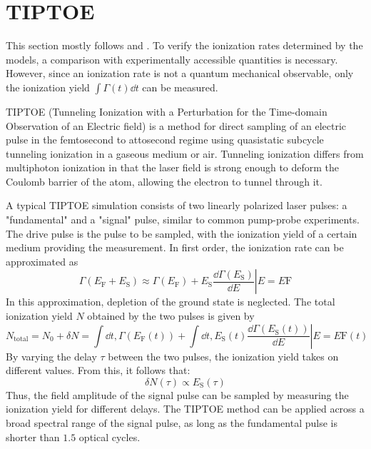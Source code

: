 \section{TIPTOE}
This section mostly follows \cite{Park:18} and \cite{manorammasterthesis}.
To verify the ionization rates determined by the models, a comparison with experimentally accessible quantities is necessary.
However, since an ionization rate is not a quantum mechanical observable, only the ionization yield $\int \Gamma(t) \dd t$ can be measured.

TIPTOE \cite{Park:18} (Tunneling Ionization with a Perturbation for the Time-domain Observation of an Electric field) is a method for direct sampling of an electric pulse in the femtosecond to attosecond regime using quasistatic subcycle tunneling ionization in a gaseous medium or air.
Tunneling ionization differs from multiphoton ionization in that the laser field is strong enough to deform the Coulomb barrier of the atom, allowing the electron to tunnel through it.

A typical TIPTOE simulation consists of two linearly polarized laser pulses: a "fundamental" and a "signal" pulse, similar to common pump-probe experiments.
The drive pulse is the pulse to be sampled, with the ionization yield of a certain medium providing the measurement.
In first order, the ionization rate can be approximated as
\begin{equation}
\Gamma(E_{\mathrm{F}}+E_{\mathrm{S}})\approx\Gamma(E_{\mathrm{F}})+\left.E_{\mathrm{S}}\frac{\dd \Gamma(E_{\mathrm{S}})}{\dd E}\right|{E=E{\mathrm{F}}}
\end{equation}
In this approximation, depletion of the ground state is neglected.
The total ionization yield $N$ obtained by the two pulses is given by
\begin{equation*}
N_{\mathrm{total}}=N_0+\delta N = \int \dd t,\Gamma(E_{\mathrm{F}}(t))+\int \dd t,E_{\mathrm{S}}(t)\left.\frac{\dd \Gamma(E_{\mathrm{S}}(t))}{\dd E}\right|{E=E{\mathrm{F}}(t)}
\end{equation*}
By varying the delay $\tau$ between the two pulses, the ionization yield takes on different values.
From this, it follows that:
\begin{equation}
\delta N(\tau)\propto E_{\mathrm{S}}(\tau) \label{eq:tiptoeprop}
\end{equation}
Thus, the field amplitude of the signal pulse can be sampled by measuring the ionization yield for different delays.
The TIPTOE method can be applied across a broad spectral range of the signal pulse, as long as the fundamental pulse is shorter than $1.5$ optical cycles.

